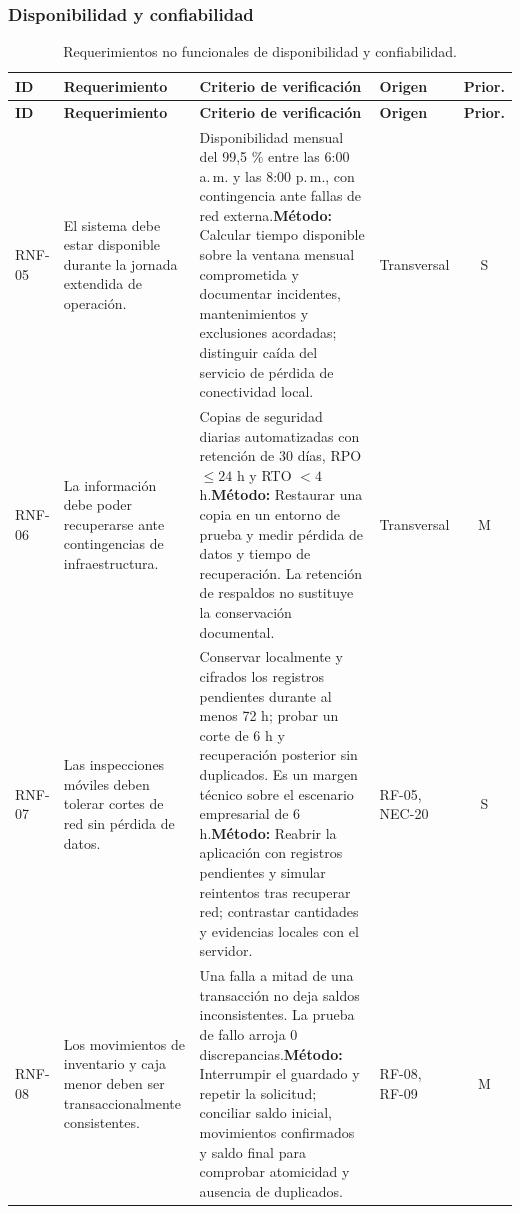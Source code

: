 \documentclass[12pt,letterpaper]{article}
\begin{document}
\subsubsection{Disponibilidad y confiabilidad}

{\small
\begin{longtable}{@{}L{1.8cm} L{4.65cm} L{4.75cm} L{2.1cm} c@{}}
\caption{Requerimientos no funcionales de disponibilidad y confiabilidad.}\\
\toprule{}
\textbf{ID} & \textbf{Requerimiento} & \textbf{Criterio de verificación} & \textbf{Origen} & \textbf{Prior.} \\
\midrule
\endfirsthead
\toprule{}
\textbf{ID} & \textbf{Requerimiento} & \textbf{Criterio de verificación} & \textbf{Origen} & \textbf{Prior.} \\
\midrule
\endhead
\bottomrule
\endfoot
RNF-05 & El sistema debe estar disponible durante la jornada extendida de operación. & Disponibilidad mensual del 99,5 \% entre las 6:00 a.\,m. y las 8:00 p.\,m., con contingencia ante fallas de red externa.\newline \textbf{Método:} Calcular tiempo disponible sobre la ventana mensual comprometida y documentar incidentes, mantenimientos y exclusiones acordadas; distinguir caída del servicio de pérdida de conectividad local. & Transversal & S \\
RNF-06 & La información debe poder recuperarse ante contingencias de infraestructura. & Copias de seguridad diarias automatizadas con retención de 30 días, RPO $\le 24$ h y RTO $< 4$ h.\newline \textbf{Método:} Restaurar una copia en un entorno de prueba y medir pérdida de datos y tiempo de recuperación. La retención de respaldos no sustituye la conservación documental. & Transversal & M \\
RNF-07 & Las inspecciones móviles deben tolerar cortes de red sin pérdida de datos. & Conservar localmente y cifrados los registros pendientes durante al menos 72 h; probar un corte de 6 h y recuperación posterior sin duplicados. Es un margen técnico sobre el escenario empresarial de 6 h.\newline \textbf{Método:} Reabrir la aplicación con registros pendientes y simular reintentos tras recuperar red; contrastar cantidades y evidencias locales con el servidor. & RF-05, NEC-20 & S \\
RNF-08 & Los movimientos de inventario y caja menor deben ser transaccionalmente consistentes. & Una falla a mitad de una transacción no deja saldos inconsistentes. La prueba de fallo arroja 0 discrepancias.\newline \textbf{Método:} Interrumpir el guardado y repetir la solicitud; conciliar saldo inicial, movimientos confirmados y saldo final para comprobar atomicidad y ausencia de duplicados. & RF-08, RF-09 & M \\
\end{longtable}
}
\end{document}
